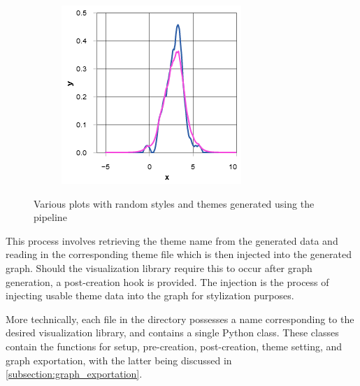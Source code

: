 \begin{figure}
\begin{subfigure}[b]{0.32\textwidth}
        \includegraphics[width=\textwidth]{figures/body/procedure/kd.png}
    \end{subfigure}
    \caption{Various plots with random styles and themes generated using the pipeline}
    \label{figure:plots}
\end{figure}

This process involves retrieving the theme name from the generated data and reading in the corresponding theme file which is then injected into the generated graph. Should the visualization library require this to occur after graph generation, a post-creation hook is provided. The injection is the process of injecting usable theme data into the graph for stylization purposes. 

\hfill 

More technically, each file in the  directory possesses a name corresponding to the desired visualization library, and contains a single Python class. These  classes contain the functions for setup, pre-creation, post-creation, theme setting, and graph exportation, with the latter being discussed in \autoref{subsection:graph_exportation}.

